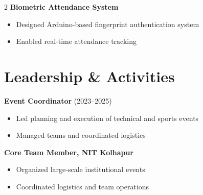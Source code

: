 \documentclass[letterpaper,10pt]{article}
\begin{document}
\begin{paracol}{2}
\textbf{Biometric Attendance System}
\begin{itemize}
    \item Designed Arduino-based fingerprint authentication system
    \item Enabled real-time attendance tracking
\end{itemize}

\section*{Leadership \& Activities}

\textbf{Event Coordinator} (2023--2025)
\begin{itemize}
    \item Led planning and execution of technical and sports events
    \item Managed teams and coordinated logistics
\end{itemize}
\vspace{3pt}

\textbf{Core Team Member, NIT Kolhapur}
\begin{itemize}
    \item Organized large-scale institutional events
    \item Coordinated logistics and team operations
\end{itemize}

\end{paracol}
\end{document}
